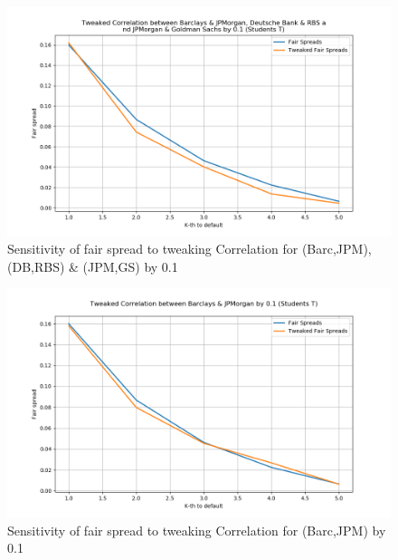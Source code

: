 \documentclass{report}
\theoremstyle{plain}
\theoremstyle{definition}
\begin{document}
\begin{figure}[H]
	\begin{center}
		\includegraphics[width=15cm]{Tweaked_Correlation_between_Barclays_&_JPMorgan,_Deutsche_Bank_&_RBS_and_JPMorgan_&_Goldman_Sachs_by_0,1_(Students_T).png}
		\caption{Sensitivity of fair spread to tweaking Correlation for (Barc,JPM), (DB,RBS) \& (JPM,GS) by 0.1} 
		\label{Tweaked_Correlation_between_Barclays_&_JPMorgan,_Deutsche_Bank_&_RBS_and_JPMorgan_&_Goldman_Sachs_by_0.1_(Students_T)}
	\end{center}
\end{figure}

\begin{figure}[H]
	\begin{center}
		\includegraphics[width=15cm]{Tweaked_Correlation_between_Barclays_&_JPMorgan_by_0,1_(Students_T).png}
		\caption{Sensitivity of fair spread to tweaking Correlation for (Barc,JPM) by 0.1} 
		\label{Tweaked_Correlation_between_Barclays_&_JPMorgan_by_0.1_(Students_T)}
	\end{center}
\end{figure}
\end{document}
